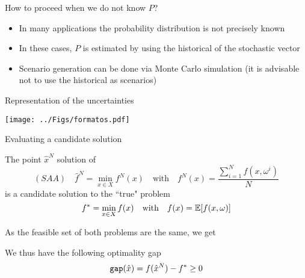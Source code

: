  
\begin{frame}
\begin{block}{How to proceed when we do not know $P$?}
\begin{itemize}
\item In many applications the probability distribution is not precisely known
\pula

\item In these cases, $ P $ is estimated by using the historical of the stochastic vector
\pula

\item Scenario generation can be done via Monte Carlo simulation (it is advisable not to use
the historical as scenarios)
\end{itemize}
\pula
\end{block}
\begin{block}{Representation of the uncertainties}
\begin{center}
\texttt{[image: ../Figs/formatos.pdf]} {}
\end{center}
\end{block} 
\end{frame}










 
 

 
 
\begin{frame}{Evaluating a candidate solution }

The point $\hat x^N$ solution  of
\[
(SAA)\quad \hat f^N=\min_{x \in X} f^N(x)\quad \mbox{with}\quad f^N(x)=\frac{\sum_{i=1}^N f(x,\omega^i)}{N}
\]
is a candidate solution to the ``true" problem
\[
f^*=\min_{x \in X} f(x)\quad \mbox{with}\quad f(x)=\mathbb{E}[f(x,\omega)] 
\]
\pula

As the feasible set of both problems are the same, we get 

\pula
We thus have the following  optimality gap
\[
{\tt gap} (\hat x)=f(\hat x^N)- f^*\geq 0
\]

 \end{frame}
 
